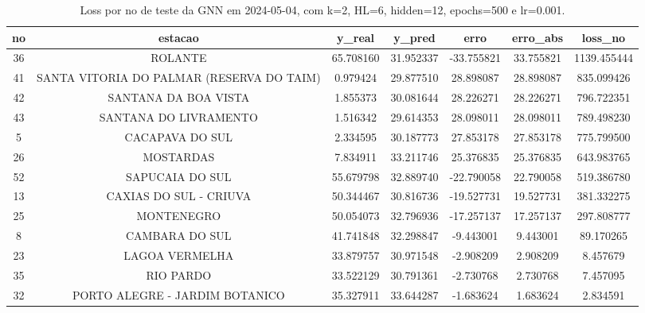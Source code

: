 \begin{table}[h]
\centering
\caption{Loss por no de teste da GNN em 2024-05-04, com k=2, HL=6, hidden=12, epochs=500 e lr=0.001.}
\label{tab:gnn_loss_k2_hl6_h12_e500_d20240504}
\begin{tabular}{ccccccc}
\toprule
no & estacao & y\_real & y\_pred & erro & erro\_abs & loss\_no \\
\midrule
36 & ROLANTE & 65.708160 & 31.952337 & -33.755821 & 33.755821 & 1139.455444 \\
41 & SANTA VITORIA DO PALMAR (RESERVA DO TAIM) & 0.979424 & 29.877510 & 28.898087 & 28.898087 & 835.099426 \\
42 & SANTANA DA BOA VISTA & 1.855373 & 30.081644 & 28.226271 & 28.226271 & 796.722351 \\
43 & SANTANA DO LIVRAMENTO & 1.516342 & 29.614353 & 28.098011 & 28.098011 & 789.498230 \\
5 & CACAPAVA DO SUL & 2.334595 & 30.187773 & 27.853178 & 27.853178 & 775.799500 \\
26 & MOSTARDAS & 7.834911 & 33.211746 & 25.376835 & 25.376835 & 643.983765 \\
52 & SAPUCAIA DO SUL & 55.679798 & 32.889740 & -22.790058 & 22.790058 & 519.386780 \\
13 & CAXIAS DO SUL - CRIUVA & 50.344467 & 30.816736 & -19.527731 & 19.527731 & 381.332275 \\
25 & MONTENEGRO & 50.054073 & 32.796936 & -17.257137 & 17.257137 & 297.808777 \\
8 & CAMBARA DO SUL & 41.741848 & 32.298847 & -9.443001 & 9.443001 & 89.170265 \\
23 & LAGOA VERMELHA & 33.879757 & 30.971548 & -2.908209 & 2.908209 & 8.457679 \\
35 & RIO PARDO & 33.522129 & 30.791361 & -2.730768 & 2.730768 & 7.457095 \\
32 & PORTO ALEGRE - JARDIM BOTANICO & 35.327911 & 33.644287 & -1.683624 & 1.683624 & 2.834591 \\
\bottomrule
\end{tabular}
\end{table}
